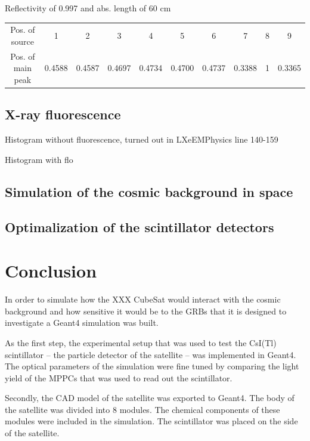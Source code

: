 \documentclass[12pt, a4paper,titlepage]{article}
\numberwithin{equation}{section}
\numberwithin{figure}{section}
\begin{document}
Reflectivity of 0.997 and abs. length of 60 cm

\begin{center}
\begin{tabular}{ |c|c|c|c|c|c|c|c|c|c| } 
 \hline
  Pos. of source & 1 & 2 & 3 & 4 & 5 & 6 & 7 & 8 & 9 \\ 
  Pos. of main peak & 0.4588 & 0.4587 & 0.4697 & 0.4734 & 0.4700 & 0.4737 & 0.3388 & 1 & 0.3365  \\ 
 \hline
\end{tabular}
\end{center}




\subsection{X-ray fluorescence}
Histogram without fluorescence, turned out in LXeEMPhysics line 140-159

Histogram with flo

\subsection{Simulation of the cosmic background in space}


\subsection{Optimalization of the scintillator detectors}

\pagebreak
\section{Conclusion}

In order to simulate how the XXX CubeSat would interact with the cosmic background and how sensitive it would be to the GRBs that it is designed to investigate a Geant4 simulation was built.

As the first step, the experimental setup that was used to test the CsI(Tl) scintillator -- the particle detector of the satellite -- was implemented in Geant4. The optical parameters of the simulation were fine tuned by comparing the light yield of the MPPCs that was used to read out the scintillator.

Secondly, the CAD model of the satellite was exported to Geant4. The body of the satellite was divided into 8 modules. The chemical components of these modules were included in the simulation. The scintillator was placed on the side of the satellite.
\end{document}
